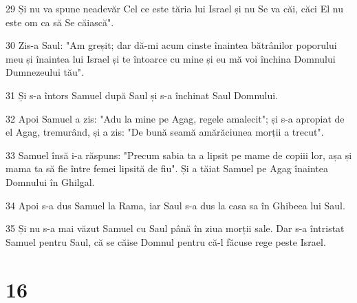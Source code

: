 \par 29 Și nu va spune neadevăr Cel ce este tăria lui Israel și nu Se va căi, căci El nu este om ca să Se căiască".
\par 30 Zis-a Saul: "Am greșit; dar dă-mi acum cinste înaintea bătrânilor poporului meu și înaintea lui Israel și te întoarce cu mine și eu mă voi închina Domnului Dumnezeului tău".
\par 31 Și s-a întors Samuel după Saul și s-a închinat Saul Domnului.
\par 32 Apoi Samuel a zis: "Adu la mine pe Agag, regele amalecit"; și s-a apropiat de el Agag, tremurând, și a zis: "De bună seamă amărăciunea morții a trecut".
\par 33 Samuel însă i-a răspuns: "Precum sabia ta a lipsit pe mame de copiii lor, așa și mama ta să fie între femei lipsită de fiu". Și a tăiat Samuel pe Agag înaintea Domnului în Ghilgal.
\par 34 Apoi s-a dus Samuel la Rama, iar Saul s-a dus la casa sa în Ghibeea lui Saul.
\par 35 Și nu s-a mai văzut Samuel cu Saul până în ziua morții sale. Dar s-a întristat Samuel pentru Saul, că se căise Domnul pentru că-l făcuse rege peste Israel.

\chapter{16}

